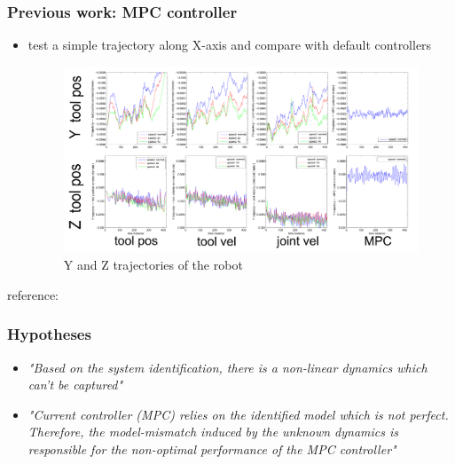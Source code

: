 \documentclass{beamer}
\begin{document}
	\begin{frame}\frametitle{Previous work: MPC controller }
		\vspace{2mm}
		\begin{itemize}
			\fontsize{8}{4}\selectfont
			\item test a simple trajectory along X-axis and compare with default controllers
			
			\begin{figure}
				\centering
				\includegraphics[width=1\linewidth]{images/trajectory_data.pdf}
				\caption{\fontsize{8}{4}\selectfont Y and Z trajectories of the robot}
			\end{figure}
		\end{itemize}
		\centering
		\fontsize{8}{4}\selectfont	reference: \citet{Gier2013}				
	\end{frame}	


	\begin{frame}\frametitle{Hypotheses}
		\vspace{2mm}
		\begin{itemize}
			\fontsize{8}{4}\selectfont
			\item \textit{"Based on the system identification, there is a non-linear dynamics which can't be captured"}
			\vspace{3mm}
			\item \textit{"Current controller (MPC) relies on the identified model which is not perfect. Therefore, the model-mismatch induced by the unknown dynamics is responsible for the non-optimal performance of the MPC controller" }
		\end{itemize}
	\end{frame}
\end{document}
